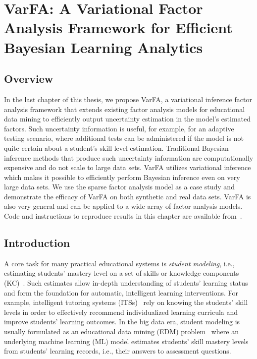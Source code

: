 \chapter{VarFA: A Variational Factor Analysis Framework for Efficient Bayesian Learning Analytics}
\section*{Overview}
In the last chapter of this thesis, we propose VarFA, a variational inference factor analysis framework that extends existing factor analysis models for educational data mining to efficiently output uncertainty estimation in the model's estimated factors. Such uncertainty information is useful, for example, for an adaptive testing scenario, where additional tests can be administered if the model is not quite certain about a student's skill level estimation. Traditional Bayesian inference methods that produce such uncertainty information are computationally expensive and do not scale to large data sets. VarFA utilizes variational inference which makes it possible to efficiently perform Bayesian inference even on very large data sets. We use the sparse factor analysis model as a case study and demonstrate the efficacy of VarFA on both synthetic and real data sets. VarFA is also very general and can be applied to a wide array of factor analysis models. Code and instructions to reproduce results in this chapter are available from~{}.
\section{Introduction}
\label{sec:intro}
%
A core task for many practical educational systems is \textit{student
    modeling}, i.e., estimating students' mastery level on a set of skills or
knowledge components (KC)~\cite{vanlehn1988student, chrysafiadi2013student}.
Such estimates allow in-depth understanding of students' learning status and
form the foundation for automatic, intelligent learning interventions. For
example, intelligent tutoring systems (ITSs)~\cite{shute1994intelligent,
    pls1,anderson1995cognitive,nye2014autotutor,heffernan2014assistments,rafferty2015inferring}
rely on knowing the students' skill levels in order to effectively recommend
individualized learning curricula and improve students' learning outcomes. In
the big data era, student modeling is usually formulated as an educational data
mining (EDM)
problem~\cite{romero2010educational,baker2009state,merceron2005educational}
where an underlying machine learning (ML) model estimates students' skill
mastery levels from students' learning records, i.e., their answers to
assessment questions.

